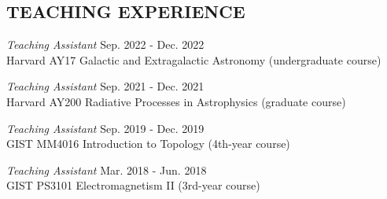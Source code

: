 \documentclass[margin, 10pt]{res} %
\begin{document}
\begin{resume}


\section{TEACHING EXPERIENCE}

{\sl Teaching Assistant} \hfill Sep. 2022 - Dec. 2022 \\
Harvard AY17 Galactic and Extragalactic Astronomy (undergraduate course)

{\sl Teaching Assistant} \hfill Sep. 2021 - Dec. 2021 \\
Harvard AY200 Radiative Processes in Astrophysics (graduate course)

{\sl Teaching Assistant} \hfill Sep. 2019 - Dec. 2019 \\
GIST MM4016 Introduction to Topology (4th-year course)

{\sl Teaching Assistant} \hfill Mar. 2018 - Jun. 2018 \\
GIST PS3101 Electromagnetism II (3rd-year course)


\end{resume}
\end{document}
